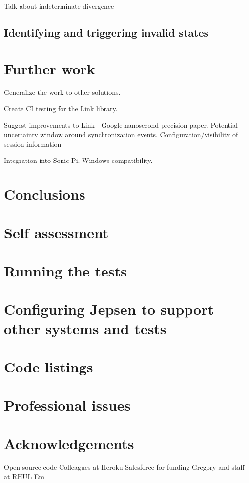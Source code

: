 \documentclass[11pt]{article} %
\theoremstyle{plain}
\theoremstyle{definition}
\begin{document}
Talk about indeterminate divergence

\subsection{Identifying and triggering invalid states}

\section{Further work}

Generalize the work to other solutions.

Create CI testing for the Link library.

Suggest improvements to Link - Google nanosecond precision paper. Potential
uncertainty window around synchronization events. Configuration/visibility of
session information.

Integration into Sonic Pi. Windows compatibility.

\section{Conclusions}




\appendix
\section{Self assessment}
\section{Running the tests}
\section{Configuring Jepsen to support other systems and tests}
\section{Code listings}
\section{Professional issues}
\section{Acknowledgements}

Open source code
Colleagues at Heroku
Salesforce for funding
Gregory and staff at RHUL
Em
\end{document}
